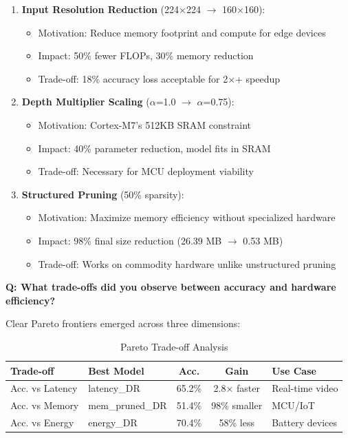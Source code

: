 \documentclass[10pt, a4paper]{article}
\begin{document}
\begin{enumerate}
    \item \textbf{Input Resolution Reduction} (224×224 $\rightarrow$ 160×160):
    \begin{itemize}
        \item Motivation: Reduce memory footprint and compute for edge devices
        \item Impact: 50\% fewer FLOPs, 30\% memory reduction
        \item Trade-off: 18\% accuracy loss acceptable for 2×+ speedup
    \end{itemize}
    
    \item \textbf{Depth Multiplier Scaling} ($\alpha$=1.0 $\rightarrow$ $\alpha$=0.75):
    \begin{itemize}
        \item Motivation: Cortex-M7's 512KB SRAM constraint
        \item Impact: 40\% parameter reduction, model fits in SRAM
        \item Trade-off: Necessary for MCU deployment viability
    \end{itemize}
    
    \item \textbf{Structured Pruning} (50\% sparsity):
    \begin{itemize}
        \item Motivation: Maximize memory efficiency without specialized hardware
        \item Impact: 98\% final size reduction (26.39 MB $\rightarrow$ 0.53 MB)
        \item Trade-off: Works on commodity hardware unlike unstructured pruning
    \end{itemize}
\end{enumerate}

\textbf{Q: What trade-offs did you observe between accuracy and hardware efficiency?}

Clear Pareto frontiers emerged across three dimensions:

\begin{table}[H]
\centering
\footnotesize
\begin{tabular}{|l|l|c|c|p{3cm}|}
\hline
\textbf{Trade-off} & \textbf{Best Model} & \textbf{Acc.} & \textbf{Gain} & \textbf{Use Case} \\
\hline
Acc. vs Latency & latency\_DR & 65.2\% & 2.8× faster & Real-time video \\
Acc. vs Memory & mem\_pruned\_DR & 51.4\% & 98\% smaller & MCU/IoT \\
Acc. vs Energy & energy\_DR & 70.4\% & 58\% less & Battery devices \\
\hline
\end{tabular}
\caption{Pareto Trade-off Analysis}
\end{table}
\end{document}

